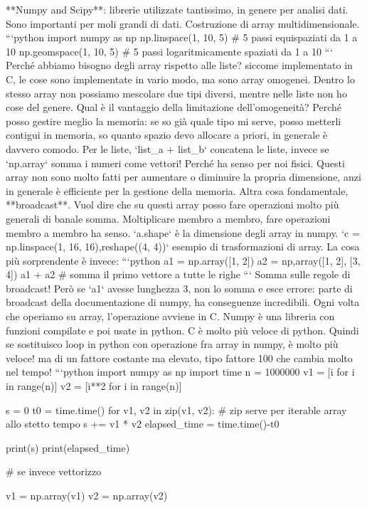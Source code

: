 \documentclass[10pt, a4paper, twosided, titlepage, draft]{book}
\begin{document}
**Numpy and Scipy**: librerie utilizzate tantissimo, in genere per analisi dati. Sono importanti per moli grandi di dati.
Costruzione di array multidimensionale.
```python
import numpy as np
np.linspace(1, 10, 5) # 5 passi equispaziati da 1 a 10 
np.geomspace(1, 10, 5) # 5 passi logaritmicamente spaziati da 1 a 10
```
Perché abbiamo bisogno degli array rispetto alle liste? siccome implementato in C, le cose sono implementate in vario modo, ma sono array omogenei. Dentro lo stesso array non possiamo mescolare due tipi diversi, mentre nelle liste non ho cose del genere.
Qual è il vantaggio della limitazione dell'omogeneità?
Perché posso gestire meglio la memoria: se so già quale tipo mi serve, posso metterli contigui in memoria, so quanto spazio devo allocare a priori, in generale è davvero comodo.
Per le liste, `list_a + list_b` concatena le liste, invece se `np.array` somma i numeri come vettori! Perché ha senso per noi fisici.
Questi array non sono molto fatti per aumentare o diminuire la propria dimensione, anzi in generale è efficiente per la gestione della memoria.
Altra cosa fondamentale, **broadcast**. Vuol dire che su questi array posso fare operazioni molto più generali di banale somma. Moltiplicare membro a membro, fare operazioni membro a membro ha senso.
`a.shape` è la dimensione degli array in numpy.
`c = np.linspace(1, 16, 16),reshape((4, 4))` esempio di trasformazioni di array.
La cosa più sorprendente è invece:
```python
a1 = np.array([1, 2])
a2 = np,array([1, 2], [3, 4])
a1 + a2 # somma il primo vettore a tutte le righe
```
Somma sulle regole di broadcast! Però se `a1` avesse lunghezza 3, non lo somma e esce errore: parte di broadcast della documentazione di numpy, ha conseguenze incredibili.
Ogni volta che operiamo su array, l'operazione avviene in C. Numpy è una libreria con funzioni compilate e poi usate in python. C è molto più veloce di python. 
Quindi se sostituisco loop in python con operazione fra array in numpy, è molto più veloce! ma di un fattore costante ma elevato, tipo fattore 100 che cambia molto nel tempo!
```python
import numpy as np
import time
n = 1000000
v1 = [i for i in range(n)]
v2 = [i**2 for i in range(n)]

s = 0
t0 = time.time()
for v1, v2 in zip(v1, v2): # zip serve per iterable array allo stetto tempo
s += v1 * v2
elapsed_time = time.time()-t0

print(s)
print(elapsed_time)

# se invece vettorizzo

v1 = np.array(v1)
v2 = np.array(v2)
\end{document}
